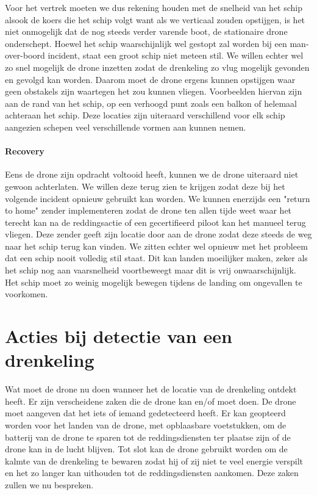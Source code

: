 Voor het vertrek moeten we dus rekening houden met de snelheid van het schip alsook de koers die het schip volgt want als we verticaal zouden opstijgen, is het niet onmogelijk dat de nog steeds verder varende boot, de stationaire drone onderschept. Hoewel het schip waarschijnlijk wel gestopt zal worden bij een man-over-boord incident, staat een groot schip niet meteen stil. We willen echter wel zo snel mogelijk de drone inzetten zodat de drenkeling zo vlug mogelijk gevonden en gevolgd kan worden. Daarom moet de drone ergens kunnen opstijgen waar geen obstakels zijn waartegen het zou kunnen vliegen. Voorbeelden hiervan zijn aan de rand van het schip, op een verhoogd punt zoals een balkon of helemaal achteraan het schip. Deze locaties zijn uiteraard verschillend voor elk schip aangezien schepen veel verschillende vormen aan kunnen nemen.

\paragraph{Recovery}

Eens de drone zijn opdracht voltooid heeft, kunnen we de drone uiteraard niet gewoon achterlaten. We willen deze terug zien te krijgen zodat deze bij het volgende incident opnieuw gebruikt kan worden. We kunnen enerzijds een "return to home" zender implementeren zodat de drone ten allen tijde weet waar het terecht kan na de reddingsactie of een gecertifieerd piloot kan het manueel terug vliegen. Deze zender geeft zijn locatie door aan de drone zodat deze steeds de weg naar het schip terug kan vinden. We zitten echter wel opnieuw met het probleem dat een schip nooit volledig stil staat. Dit kan landen moeilijker maken, zeker als het schip nog aan vaarsnelheid voortbeweegt maar dit is vrij onwaarschijnlijk. Het schip moet zo weinig mogelijk bewegen tijdens de landing om ongevallen te voorkomen.

\section{Acties bij detectie van een drenkeling}

Wat moet de drone nu doen wanneer het de locatie van de drenkeling ontdekt heeft. Er zijn verscheidene zaken die de drone kan en/of moet doen. De drone moet aangeven dat het iets of iemand gedetecteerd heeft. Er kan geopteerd worden voor het landen van de drone, met opblaasbare voetstukken, om de batterij van de drone te sparen tot de reddingsdiensten ter plaatse zijn of de drone kan in de lucht blijven. Tot slot kan de drone gebruikt worden om de kalmte van de drenkeling te bewaren zodat hij of zij niet te veel energie verspilt en het zo langer kan uithouden tot de reddingsdiensten aankomen. Deze zaken zullen we nu bespreken.

